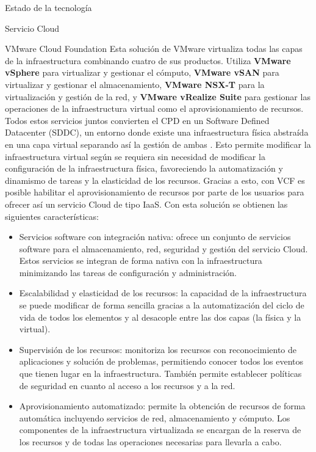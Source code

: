 \begin{chapter}{Estado de la tecnología}
\begin{section}{Servicio Cloud}
\begin{subsection}{VMware Cloud Foundation}
        Esta solución de VMware virtualiza todas las capas de la infraestructura combinando cuatro de sus productos. Utiliza \textbf{VMware vSphere} para virtualizar y gestionar el cómputo, \textbf{VMware vSAN} para virtualizar y gestionar el almacenamiento, \textbf{VMware NSX-T} para la virtualización y gestión de la red, y \textbf{VMware vRealize Suite} para gestionar las operaciones de la infraestructura virtual como el aprovisionamiento de recursos. Todos estos servicios juntos convierten el CPD en un Software Defined Datacenter (SDDC), un entorno donde existe una infraestructura física abstraída en una capa virtual separando así la gestión de ambas \cite{sddc-definition}. Esto permite modificar la infraestructura virtual según se requiera sin necesidad de modificar la configuración de la infraestructura física, favoreciendo la automatización y dinamismo de tareas y la elasticidad de los recursos. Gracias a esto, con VCF es posible habilitar el aprovisionamiento de recursos por parte de los usuarios para ofrecer así un servicio Cloud de tipo IaaS. Con esta solución se obtienen las siguientes características:
        
    \begin{itemize}
        \item Servicios software con integración nativa: ofrece un conjunto de servicios software para el almacenamiento, red, seguridad y gestión del servicio Cloud. Estos servicios se integran de forma nativa con la infraestructura minimizando las tareas de configuración y administración.
        \item Escalabilidad y elasticidad de los recursos: la capacidad de la infraestructura se puede modificar de forma sencilla gracias a la automatización del ciclo de vida de todos los elementos y al desacople entre las dos capas (la física y la virtual).
        \item Supervisión de los recursos: monitoriza los recursos con reconocimiento de aplicaciones y solución de problemas, permitiendo conocer todos los eventos que tienen lugar en la infraestructura. También permite establecer políticas de seguridad en cuanto al acceso a los recursos y a la red.
        \item Aprovisionamiento automatizado: permite la obtención de recursos de forma automática incluyendo servicios de red, almacenamiento y cómputo. Los componentes de la infraestructura virtualizada se encargan de la reserva de los recursos y de todas las operaciones necesarias para llevarla a cabo.
    

\end{itemize}
\end{subsection}
\end{section}
\end{chapter}
